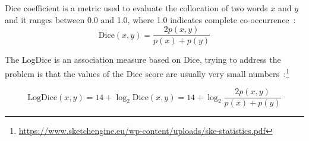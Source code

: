 

\begin{definition}
Dice coefficient is a metric used to evaluate the collocation of two words $x$ and $y$ 
and it ranges between 0.0 and 1.0, where 1.0 indicates complete co-occurrence~\citep{Manning1999}:
\[\text{Dice}(x,y) = \frac{2 p(x,y)}{p(x) + p(y)}\] %
\end{definition}


    
\begin{definition}
The LogDice is an association measure based on Dice, trying to address the problem is
that the values of the Dice score are usually very small numbers~\citep{Rychly2008}:\footnote{\url{https://www.sketchengine.eu/wp-content/uploads/ske-statistics.pdf}}

\[\text{LogDice}(x,y) = 14 + \log_{2} \text{Dice}(x,y)=  14 + \log_{2}\frac{2 p(x,y)}{p(x) + p(y)}\]
\end{definition}

